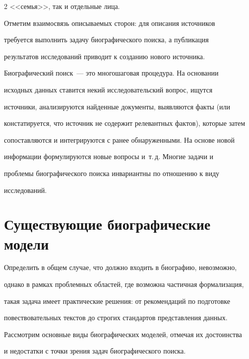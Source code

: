 \begin{multicols}{2}
<<семья>>, так и отдельные лица. 


  


  Отметим взаимосвязь описываемых сторон: для описания источников 


требуется выполнить задачу биографического поиска, а публикация 


результатов исследований приводит к созданию нового источника.


  


  Биографический поиск~--- это многошаговая процедура. На основании 


исходных данных ставится некий исследовательский вопрос, ищутся 


источники, анализируются найденные документы, выявляются факты (или 


констатируется, что источник не содержит релевантных фактов), которые затем 


сопоставляются и интегрируются с ранее обнаруженными. На основе новой 


информации формулируются новые вопросы и~т.\,д. Многие задачи и 


проблемы биографического поиска инвариантны по отношению к виду 


исследований.





\section{Существующие биографические модели}





\vspace*{-6pt}


  


  Определить в общем случае, что должно входить в биографию, невозможно, 


однако в рамках проб\-лем\-ных областей, где возможна частичная формализация, 


такая задача имеет практические решения: от рекомендаций по подготовке 


повествовательных текстов до строгих стандартов представления данных. 


Рассмотрим основные виды биографических моделей, отмечая их достоинства 


и недостатки с точки зрения задач биографического поиска.



\end{multicols}
